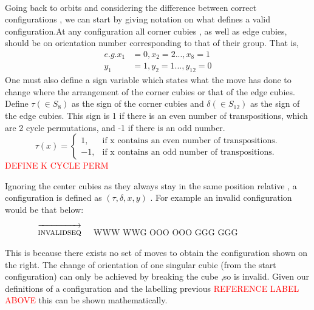 \documentclass{article}
\begin{document}
\paragraph*{}
Going back to orbits and considering the difference between correct configurations , we can start by giving notation on what defines a valid configuration.At any configuration all corner cubies , as well as edge cubies, should be on orientation number corresponding to that of their group. That is,
\begin{align*}
e.g. x_1&=0, x_2=2 ...,x_8=1\\
y_1&=1, y_2=1 ... , y_12=0
\end{align*}
One must also define a sign variable which states what the move has done to change where the arrangement of the corner cubies or that of the edge cubies. 
Define $\tau (\in S_{8})$ as the sign of the corner cubies and $\delta (\in  S_{12})$ as the sign of the edge cubies. This sign is 1 if there is an even number of transpositions, which are 2 cycle permutations, and -1 if there is an odd number. 
\begin{equation}
  \tau(x)=\begin{cases}
    1, & \text{if x contains an even number of transpositions}.\\
    -1, & \text{if x contains an odd number of transpositions}.
  \end{cases}
\end{equation}
\textcolor{red}{DEFINE K CYCLE PERM}

Ignoring the center cubies as they always stay in the same position relative , a configuration is defined as \textbf{$(\tau,\delta, x, y)$ }.
For example an invalid configuration would be that below:

\newcommand{\invalidseq}{[invalidseq],F2,F2}%
\newcommand{\invalidseqarrow}{$\quad\overrightarrow{\strut\textsc{invalidseq}}\quad$}

\begin{figure}
\centering
  \RubikCubeSolved%
  \invalidseqarrow
  \RubikRotation{\invalidseq}
   {W}{W}{W} {W}{W}{G}%
   {O}{O}{O} {O}{O}{O}%
   {G}{G}{G} {G}{G}{G}%
\end{figure}
\vspace{20pt}
This is because there exists no set of moves to obtain the configuration shown on the right. The change of orientation of one singular cubie (from the start configuration) can only be achieved by breaking the cube ,so is invalid. Given our definitions of a configuration and the labelling previous \textcolor{red}{REFERENCE LABEL ABOVE} this can be shown mathematically. 
\end{document}
